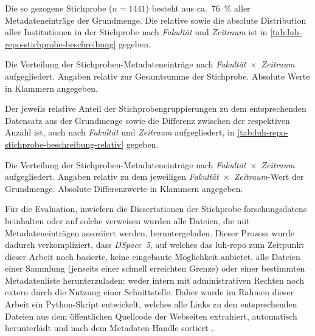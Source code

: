 Die so gezogene Stichprobe ($n=1441$) besteht aus ca.~\SI[round-mode=places,round-precision=2]{76}{\percent} aller Metadateneinträge der Grundmenge.
Die relative sowie die absolute Distribution aller Institutionen in der Stichprobe nach \textit{Fakultät} und \textit{Zeitraum} ist in \cref{tab:luh-repo-stichprobe-beschreibung} gegeben.
\begin{table}[!htbp]
	\caption{Die Verteilung der Stichproben-Metadateneinträge nach \textit{Fakultät}~$\times$~\textit{Zeitraum} aufgegliedert.
    Angaben relativ zur Gesamtsumme der Stichprobe.
    Absolute Werte in Klammern angegeben.}
    
	\label{tab:luh-repo-stichprobe-beschreibung}
\end{table}
Der jeweils relative Anteil der Stichprobengruppierungen zu dem entsprechenden Datensatz aus der Grundmenge sowie die Differenz zwischen der respektiven Anzahl ist, auch nach \textit{Fakultät} und \textit{Zeitraum} aufgegliedert, in \cref{tab:luh-repo-stichprobe-beschreibung-relativ} gegeben.
\begin{table}[!htbp]
	\caption{Die Verteilung der Stichproben-Metadateneinträge nach \textit{Fakultät}~$\times$~\textit{Zeitraum} aufgegliedert.
    Angaben relativ zu dem jeweiligen \textit{Fakultät}~$\times$~\textit{Zeitraum}-Wert der Grundmenge.
    Absolute Differenzwerte in Klammern angegeben.}
    
	\label{tab:luh-repo-stichprobe-beschreibung-relativ}
\end{table}

Für die Evaluation, inwiefern die Dissertationen der Stichprobe \glspl{forschungsdaten} beinhalten oder auf solche verweisen wurden alle Dateien, die mit Metadateneinträgen assoziiert werden, heruntergeladen.
Dieser Prozess wurde dadurch verkompliziert, dass \textit{DSpace~5}, auf welches das \gls{luh-repo} zum Zeitpunkt dieser Arbeit noch basierte, keine eingebaute Möglichkeit anbietet, alle Dateien einer Sammlung (jenseits einer schnell erreichten Grenze) oder einer bestimmten Metadatenliste herunterzuladen:
weder intern mit administrativen Rechten noch extern durch die Nutzung einer Schnittstelle.
Daher wurde im Rahmen dieser Arbeit ein Python-Skript \autocite{my-dataset} entwickelt, welches alle Links zu den entsprechenden Dateien aus dem öffentlichen Quellcode der Webseiten extrahiert, automatisch herunterlädt und nach dem Metadaten-Handle sortiert \autocite{Krassnig2024-dspace}.

